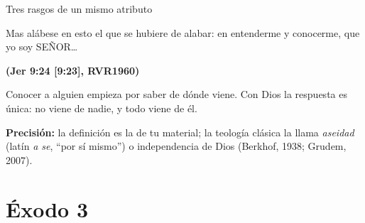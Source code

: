 \documentclass[hyperref={bookmarks=false},aspectratio=169]{beamer}
\newcommand{\SENOR}{S{\fontsize{0.78em}{1em}\selectfont EÑOR}}
\newcommand{\fuente}[1]{\par\hfill{\upshape\bfseries\footnotesize\textcolor{azul}{#1}}}
\newcommand{\precision}[1]{{\footnotesize\color{gris}\textbf{Precisión:} #1}}
\begin{document}
\begin{frame}{Tres rasgos de un mismo atributo}
\centering
{}\par\medskip
\begin{cita}Mas alábese en esto el que se hubiere de alabar: en entenderme y conocerme, que yo soy \SENOR{}\ldots\fuente{(Jer 9:24 [9:23], RVR1960)}\end{cita}
\scriptsize Conocer a alguien empieza por saber de dónde viene. Con Dios la respuesta es única: no viene de nadie, y todo viene de él.\par
\precision{la definición es la de tu material; la teología clásica la llama \emph{aseidad} (latín \emph{a se}, ``por sí mismo'') o independencia de Dios (Berkhof, 1938; Grudem, 2007).}
\end{frame}

\section{Éxodo 3}
\end{document}
